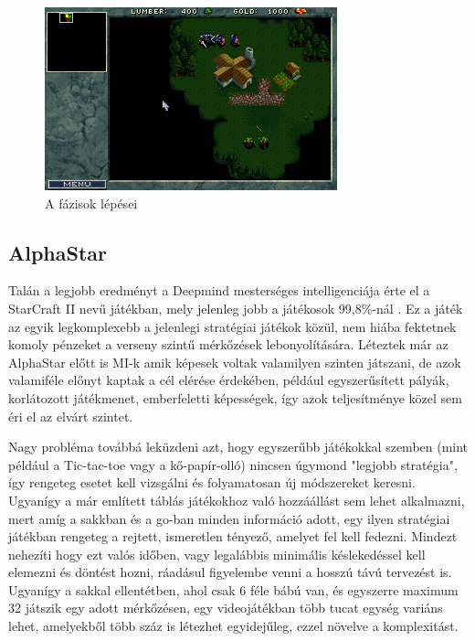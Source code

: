 \begin{figure}[h]
    \centering
    \includegraphics[scale=1]{images/wc.png}
    \caption{A fázisok lépései}
    \label{fig:warcraft}
\end{figure}

\subsection{AlphaStar}
Talán a legjobb eredményt a Deepmind mesterséges intelligenciája érte el a StarCraft II nevű játékban, mely jelenleg jobb a játékosok 99,8\%-nál {\cite{deepmind}}. 
Ez a játék az egyik legkomplexebb a jelenlegi stratégiai játékok közül, nem hiába fektetnek komoly pénzeket a verseny szintű mérkőzések lebonyolítására.
Léteztek már az AlphaStar előtt is MI-k amik képesek voltak valamilyen szinten játszani, de azok valamiféle előnyt kaptak a cél elérése érdekében, például egyszerűsített pályák, korlátozott játékmenet, emberfeletti képességek, így azok teljesítménye közel sem éri el az elvárt szintet.

Nagy probléma továbbá leküzdeni azt, hogy egyszerűbb játékokkal szemben (mint például a Tic-tac-toe vagy a kő-papír-olló) nincsen úgymond "legjobb stratégia", így rengeteg esetet kell vizsgálni és folyamatosan új módszereket keresni. Ugyanígy a már említett táblás játékokhoz való hozzáállást sem lehet alkalmazni, mert amíg a sakkban és a go-ban minden információ adott, egy ilyen stratégiai játékban rengeteg a rejtett, ismeretlen tényező, amelyet fel kell fedezni. Mindezt nehezíti hogy ezt valós időben, vagy legalábbis minimális késlekedéssel kell elemezni és döntést hozni, ráadásul figyelembe venni a hosszú távú tervezést is. Ugyanígy a sakkal ellentétben, ahol csak 6 féle bábú van, és egyszerre maximum 32 játszik egy adott mérkőzésen, egy videojátékban több tucat egység variáns lehet, amelyekből több száz is létezhet egyidejűleg, ezzel növelve a komplexitást.

